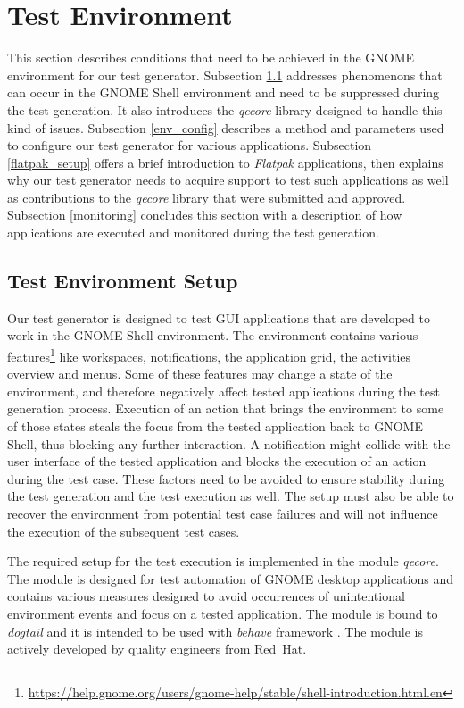 \section{Test Environment}\label{test_env}

This section describes conditions that need to be achieved in the GNOME environment for our test generator. Subsection \ref{test_ev_setup} addresses phenomenons that can occur in the GNOME Shell environment and need to be suppressed during the test generation. It also introduces the \textit{qecore} library designed to handle this kind of issues. Subsection \ref{env_config} describes a method and parameters used to configure our test generator for various applications. Subsection \ref{flatpak_setup} offers a brief introduction to \emph{Flatpak} applications, then explains why our test generator needs to acquire support to test such applications as well as contributions to the \textit{qecore} library that were submitted and approved. Subsection \ref{monitoring} concludes this section with a description of how applications are executed and monitored during the test generation. 

\subsection{Test Environment Setup}\label{test_ev_setup}

Our test generator is designed to test GUI applications that are developed to work in the GNOME Shell environment. The environment contains various features\footnote{\url{https://help.gnome.org/users/gnome-help/stable/shell-introduction.html.en}} like workspaces, notifications, the application grid, the activities overview and menus. Some of these features may change a state of the environment, and therefore negatively affect tested applications during the test generation process. Execution of an action that brings the environment to some of those states steals the focus from the tested application back to GNOME Shell, thus blocking any further interaction. A notification might collide with the user interface of the tested application and blocks the execution of an action during the test case. These factors need to be avoided to ensure stability during the test generation and the test execution as well. The setup must also be able to recover the environment from potential test case failures and will not influence the execution of the subsequent test cases. 

The required setup for the test execution is implemented in the module \textit{qecore}. The module is designed for test automation of GNOME desktop applications and contains various measures designed to avoid occurrences of unintentional environment events and focus on a tested application. The module is bound to \textit{dogtail} and it is intended to be used with \textit{behave} framework \cite{qecore}. The module is actively developed by quality engineers from Red~Hat.

